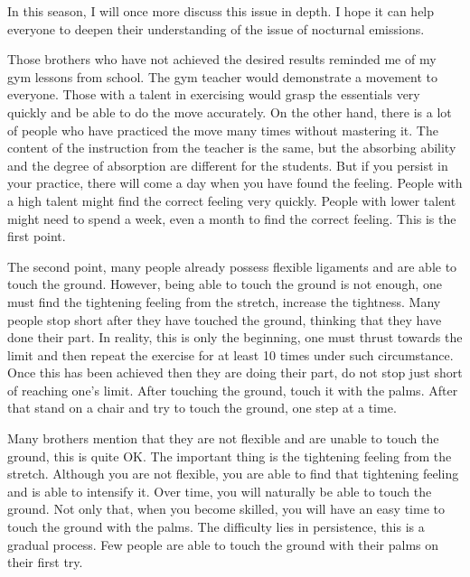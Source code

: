 \documentclass[
]{book}
\begin{document}
In this season, I will once more discuss this issue in depth. I hope it can help everyone to deepen their understanding of the issue of nocturnal emissions.

Those brothers who have not achieved the desired results reminded me of my gym lessons from school. The gym teacher would demonstrate a movement to everyone. Those with a talent in exercising would grasp the essentials very quickly and be able to do the move accurately. On the other hand, there is a lot of people who have practiced the move many times without mastering it. The content of the instruction from the teacher is the same, but the absorbing ability and the degree of absorption are different for the students. But if you persist in your practice, there will come a day when you have found the feeling. People with a high talent might find the correct feeling very quickly. People with lower talent might need to spend a week, even a month to find the correct feeling. This is the first point.

The second point, many people already possess flexible ligaments and are able to touch the ground. However, being able to touch the ground is not enough, one must find the tightening feeling from the stretch, increase the tightness. Many people stop short after they have touched the ground, thinking that they have done their part. In reality, this is only the beginning, one must thrust towards the limit and then repeat the exercise for at least 10 times under such circumstance. Once this has been achieved then they are doing their part, do not stop just short of reaching one's limit. After touching the ground, touch it with the palms. After that stand on a chair and try to touch the ground, one step at a time.

Many brothers mention that they are not flexible and are unable to touch the ground, this is quite OK. The important thing is the tightening feeling from the stretch. Although you are not flexible, you are able to find that tightening feeling and is able to intensify it. Over time, you will naturally be able to touch the ground. Not only that, when you become skilled, you will have an easy time to touch the ground with the palms. The difficulty lies in persistence, this is a gradual process. Few people are able to touch the ground with their palms on their first try.
\end{document}

